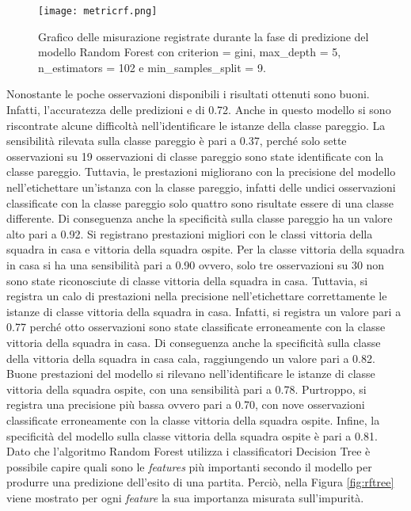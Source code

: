 \begin{figure}[]
	\begin{center}
		\texttt{[image: metricrf.png]}
		\caption{Grafico delle misurazione registrate durante la fase di predizione del modello Random Forest con \textsf{criterion} = gini, \textsf{max\_depth} = 5, \textsf{n\_estimators} = 102 e \textsf{min\_samples\_split} = 9.
		} 
		\label{fig:rfmetrics}
	\end{center}
\end{figure}
Nonostante le poche osservazioni disponibili i risultati ottenuti sono buoni. Infatti, l'accuratezza delle predizioni e di 0.72. Anche in questo modello si sono riscontrate alcune difficoltà nell'identificare le istanze della classe pareggio. La sensibilità rilevata sulla classe pareggio è pari a 0.37, perché solo sette osservazioni su 19 osservazioni di classe pareggio sono state identificate con la classe pareggio. Tuttavia, le prestazioni migliorano con la precisione del modello nell'etichettare un'istanza con la classe pareggio, infatti delle undici osservazioni classificate con la classe pareggio solo quattro sono risultate essere di una classe differente. Di conseguenza anche la specificità sulla classe pareggio ha un valore alto pari a 0.92. Si registrano prestazioni migliori con le classi vittoria della squadra in casa e vittoria della squadra ospite. Per la classe vittoria della squadra in casa si ha una sensibilità pari a 0.90 ovvero, solo tre osservazioni su 30 non sono state riconosciute di classe vittoria della squadra in casa. Tuttavia, si registra un calo di prestazioni nella precisione nell'etichettare correttamente le istanze di classe vittoria della squadra in casa. Infatti, si registra un valore pari a 0.77 perché otto osservazioni sono state classificate erroneamente con la classe vittoria della squadra in casa. Di conseguenza anche la specificità sulla classe della vittoria della squadra in casa cala, raggiungendo un valore pari a 0.82. Buone prestazioni del modello si rilevano nell'identificare le istanze di classe vittoria della squadra ospite, con una sensibilità pari a 0.78. Purtroppo, si registra una precisione più bassa ovvero pari a 0.70, con nove osservazioni classificate erroneamente con la classe vittoria della squadra ospite. Infine, la specificità del modello sulla classe vittoria della squadra ospite è pari a 0.81.\\
Dato che l'algoritmo Random Forest utilizza i classificatori Decision Tree è possibile capire quali sono le \emph{features} più importanti secondo il modello per produrre una predizione dell'esito di una partita. Perciò, nella Figura \ref{fig:rftree} viene mostrato per ogni \emph{feature} la sua importanza misurata sull'impurità.
